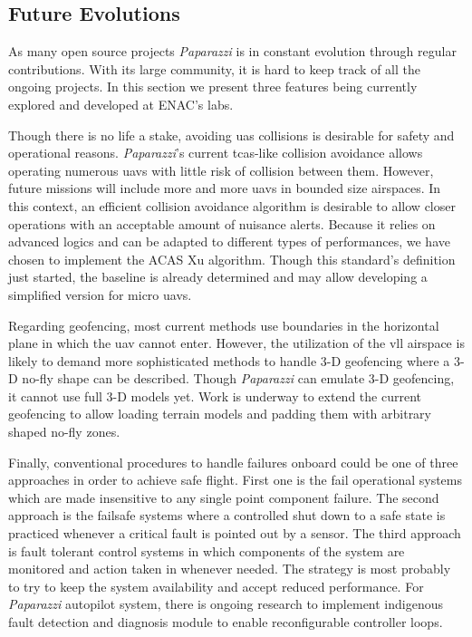 \subsection{Future Evolutions}
	As many open source projects \emph{Paparazzi} is in constant evolution through regular contributions. With its large community, it is hard to keep track of all the ongoing projects. In this section we present three features being currently explored and developed at ENAC's labs. 

	Though there is no life a stake, avoiding \gls{uas} collisions is desirable for safety and operational reasons. 
	 \emph{Paparazzi}'s current \gls{tcas}-like collision avoidance allows operating numerous \gls{uav}s with little risk of collision between them. However, future missions will include more and more \gls{uav}s in bounded size airspaces.
	 In this context, an efficient collision avoidance algorithm is desirable to allow closer operations with an acceptable amount of nuisance alerts. 
	 Because it relies on advanced logics and can be adapted to different types of performances, we have chosen to implement the ACAS Xu algorithm. Though this standard's definition just started, the baseline is already determined and may allow developing a simplified version for micro \gls{uav}s. 

	Regarding geofencing, most current methods use boundaries in the horizontal plane in which the \gls{uav} cannot enter. However, the utilization of the \gls{vll} airspace is likely to demand more sophisticated methods to handle 3-D geofencing where a 3-D no-fly shape can be described.
	Though \emph{Paparazzi} can emulate 3-D geofencing, it cannot use full 3-D models yet. Work is underway to extend the current geofencing to allow loading terrain models and padding them with arbitrary shaped no-fly zones.

	Finally, conventional procedures to handle failures onboard could be one of three approaches in order to achieve safe flight. First one is the fail operational systems which are made insensitive to any single point component failure. The second approach is the failsafe systems where a controlled shut down to a safe state is practiced whenever a critical fault is pointed out by a sensor. The third approach is fault tolerant control systems in which components of the system are monitored and action taken in whenever needed. The strategy is most probably to try to keep the system availability and accept reduced performance. For \emph{Paparazzi} autopilot system, there is ongoing research to implement indigenous fault detection and diagnosis module to enable reconfigurable controller loops. 
	
